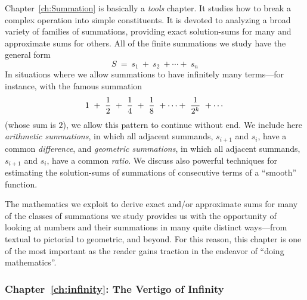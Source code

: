 \bigskip

Chapter~\ref{ch:Summation} is basically a {\em tools} chapter.  It studies how to break a complex operation into simple constituents. It is devoted to analyzing a broad variety of families of summations, providing exact solution-sums for many and approximate sums for others.  All of the finite summations we study have the general form
\[ S \ = \ s_1 \ + \ s_2 \ + \cdots + \ s_n \]
In situations where we allow summations to have infinitely many terms---for instance, with the famous summation
\[ 1 \ + \ {1 \over 2} \ + \ {1 \over 4} \ + \ {1 \over 8} \ + \cdots
+ \ {1 \over {2^k}} \ + \cdots
\]
(whose sum is $2$), we allow this pattern to continue without end.  We include here {\it arithmetic summations}, in which all adjacent summands, $s_{i+1}$ and $s_i$, have a common {\em difference}, and {\it geometric summations}, in which all adjacent summands, $s_{i+1}$ and $s_i$, have a common {\em ratio}.  We discuss also powerful techniques for estimating the solution-sums of summations of consecutive terms of a ``smooth'' function.

The mathematics we exploit to derive exact and/or approximate sums for many of the classes of summations we study provides us with the opportunity of looking at numbers and their summations in many quite distinct ways---from textual to pictorial to geometric, and beyond.  For this reason, this chapter is one of the most important as the reader gains traction in the endeavor of ``doing mathematics''.

\subsubsection{Chapter~\ref{ch:infinity}: The Vertigo of Infinity}

